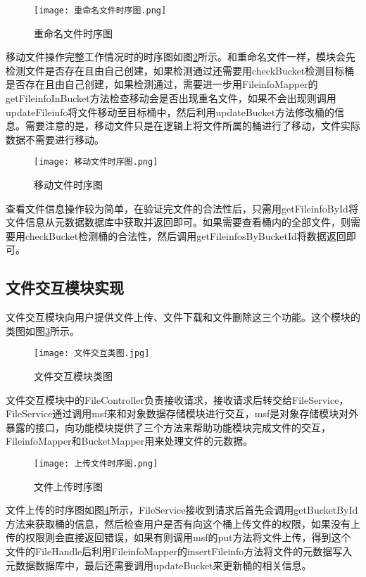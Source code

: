 \begin{figure}
  \centering
  \texttt{[image: 重命名文件时序图.png]}
  \caption{重命名文件时序图}
  \label{重命名文件时序图}
\end{figure}

移动文件操作完整工作情况时的时序图如图\ref{移动文件时序图}所示。和重命名文件一样，模块会先检测文件是否存在且由自己创建，如果检测通过还需要用checkBucket检测目标桶是否存在且由自己创建，如果检测通过，需要进一步用FileinfoMapper的getFileinfoInBucket方法检查移动会是否出现重名文件，如果不会出现则调用updateFileinfo将文件移动至目标桶中，然后利用updateBucket方法修改桶的信息。需要注意的是，移动文件只是在逻辑上将文件所属的桶进行了移动，文件实际数据不需要进行移动。

\begin{figure}
  \centering
  \texttt{[image: 移动文件时序图.png]}
  \caption{移动文件时序图}
  \label{移动文件时序图}
\end{figure}

查看文件信息操作较为简单，在验证完文件的合法性后，只需用getFileinfoById将文件信息从元数据数据库中获取并返回即可。如果需要查看桶内的全部文件，则需要用checkBucket检测桶的合法性，然后调用getFileinfosByBucketId将数据返回即可。

\subsection{文件交互模块实现}
文件交互模块向用户提供文件上传、文件下载和文件删除这三个功能。这个模块的类图如图\ref{文件交互模块类图}所示。

\begin{figure}
  \centering
  \texttt{[image: 文件交互类图.jpg]}
  \caption{文件交互模块类图}
  \label{文件交互模块类图}
\end{figure}

文件交互模块中的FileController负责接收请求，接收请求后转交给FileService，FileService通过调用msf来和对象数据存储模块进行交互，msf是对象存储模块对外暴露的接口，向功能模块提供了三个方法来帮助功能模块完成文件的交互，FileinfoMapper和BucketMapper用来处理文件的元数据。

\begin{figure}
  \centering
  \texttt{[image: 上传文件时序图.png]}
  \caption{文件上传时序图}
  \label{文件上传时序图}
\end{figure}

文件上传的时序图如图\ref{文件上传时序图}所示，FileService接收到请求后首先会调用getBucketById方法来获取桶的信息，然后检查用户是否有向这个桶上传文件的权限，如果没有上传的权限则会直接返回错误，如果有则调用msf的put方法将文件上传，得到这个文件的FileHandle后利用FileinfoMapper的insertFileinfo方法将文件的元数据写入元数据数据库中，最后还需要调用updateBucket来更新桶的相关信息。

